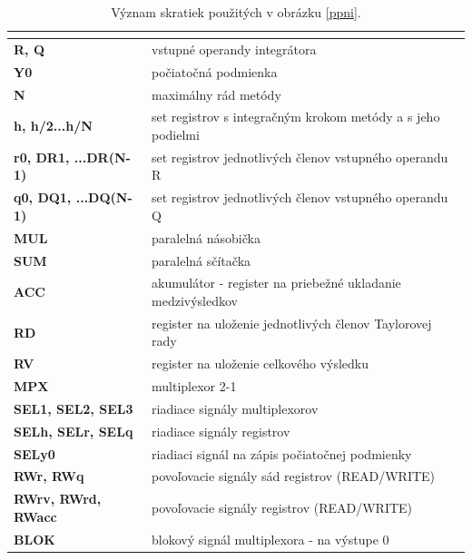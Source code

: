 \begin{table}[H]
\centering
\begin{tabular}{|
>{\columncolor[HTML]{DAE8FC}}l |l|}
\hline
\multicolumn{1}{|c|}{\cellcolor[HTML]{68CBD0}{\color[HTML]{000000} \textbf{Skratka}}} & \multicolumn{1}{c|}{\cellcolor[HTML]{68CBD0}{\color[HTML]{000000} \textbf{Popis}}} \\ \hline
\textbf{R, Q} & vstupné operandy integrátora \\ \hline
\textbf{Y0} & počiatočná podmienka \\ \hline
\textbf{N} & maximálny rád metódy \\ \hline
\textbf{h, h/2...h/N} & set registrov s integračným krokom metódy a s jeho podielmi \\ \hline
\textbf{r0, DR1, ...DR(N-1)} & set registrov jednotlivých členov vstupného operandu R \\ \hline
\textbf{q0, DQ1, ...DQ(N-1)} & set registrov jednotlivých členov vstupného operandu Q \\ \hline
\textbf{MUL} & paralelná násobička \\ \hline
\textbf{SUM} & paralelná sčítačka \\ \hline
\textbf{ACC} & akumulátor - register na priebežné ukladanie medzivýsledkov \\ \hline
\textbf{RD} & register na uloženie jednotlivých členov Taylorovej rady \\ \hline
\textbf{RV} & register na uloženie celkového výsledku \\ \hline
\textbf{MPX} & multiplexor 2-1 \\ \hline
\textbf{SEL1, SEL2, SEL3} & riadiace signály multiplexorov \\ \hline
\textbf{SELh, SELr, SELq} & riadiace signály registrov \\ \hline
\textbf{SELy0} & riadiaci signál na zápis počiatočnej podmienky \\ \hline
\textbf{RWr, RWq} & povoľovacie signály sád registrov (READ/WRITE) \\ \hline
\textbf{RWrv, RWrd, RWacc} & povoľovacie signály registrov (READ/WRITE) \\ \hline
\textbf{BLOK} & blokový signál multiplexora - na výstupe 0 \\ \hline
\end{tabular}
\caption{Význam skratiek použitých v obrázku \ref{ppni}.}
\label{my-label}
\end{table}

